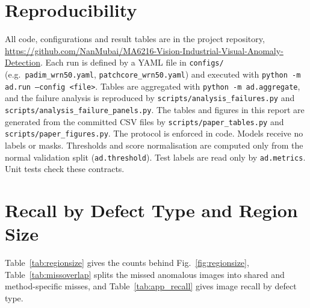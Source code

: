 \onecolumn
\section{Reproducibility}
\label{app:repro}
All code, configurations and result tables are in the project repository, \url{https://github.com/NanMubai/MA6216-Vision-Industrial-Visual-Anomaly-Detection}.
Each run is defined by a YAML file in \texttt{configs/} (e.g.\ \texttt{padim\_wrn50.yaml}, \texttt{patchcore\_wrn50.yaml}) and executed with \texttt{python -m ad.run --config <file>}.
Tables are aggregated with \texttt{python -m ad.aggregate}, and the failure analysis is reproduced by \texttt{scripts/analysis\_failures.py} and \texttt{scripts/analysis\_failure\_panels.py}.
The tables and figures in this report are generated from the committed CSV files by \texttt{scripts/paper\_tables.py} and \texttt{scripts/paper\_figures.py}.
The protocol is enforced in code.
Models receive no labels or masks.
Thresholds and score normalisation are computed only from the normal validation split (\texttt{ad.threshold}).
Test labels are read only by \texttt{ad.metrics}.
Unit tests check these contracts.

\section{Recall by Defect Type and Region Size}
\label{app:recall}
Table~\ref{tab:regionsize} gives the counts behind Fig.~\ref{fig:regionsize}, Table~\ref{tab:missoverlap} splits the missed anomalous images into shared and method-specific misses, and Table~\ref{tab:app_recall} gives image recall by defect type.
\begin{table}[!htbp]
  \centering
  \caption{GT region detection rate by region size, pooled over the six categories (data of Fig.~\ref{fig:regionsize}).}
  \label{tab:regionsize}
  \footnotesize
  
\end{table}

\begin{table}[!htbp]
  \centering
  \caption{Anomalous test images missed at the validation threshold.}
  \label{tab:missoverlap}
  \footnotesize
  \setlength{\tabcolsep}{3pt}
  
\end{table}

\begin{table}[!htbp]
  \centering
  \caption{Image recall at the validation threshold, by defect type.}
  \label{tab:app_recall}
  \footnotesize
  
\end{table}

